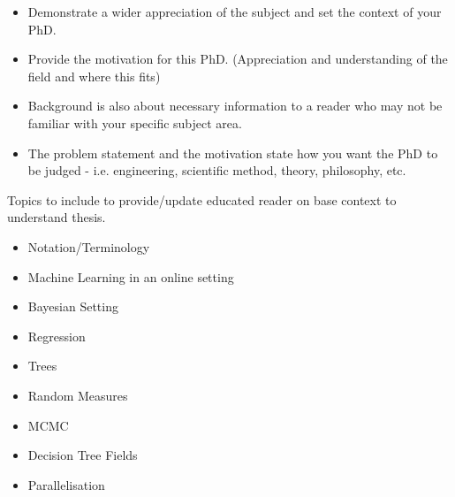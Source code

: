 \begin{itemize}
\item Demonstrate a wider appreciation of the subject and set the context of your PhD. 
\item Provide the motivation for this PhD. (Appreciation and understanding of the field and where this fits)
\item Background is also about necessary information to a reader who may not be familiar with your specific subject area.
\item The problem statement and the motivation state how you want the PhD to be judged - i.e. engineering, scientific method, theory, philosophy, etc.
\end{itemize}
Topics to include to provide/update educated reader on base context to understand thesis. 
\begin{itemize}
\item Notation/Terminology
\item Machine Learning in an online setting
\item Bayesian Setting
\item Regression
\item Trees
\item Random Measures
\item MCMC
\item Decision Tree Fields
\item Parallelisation
\end{itemize}
